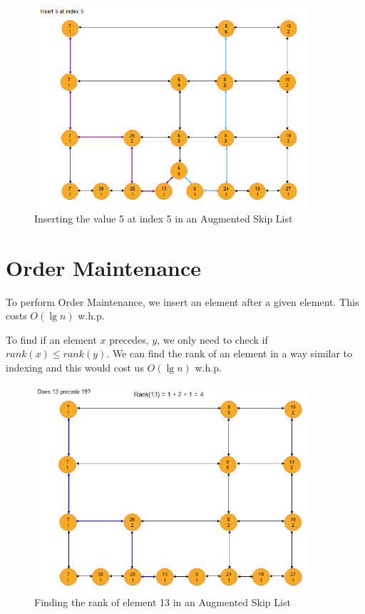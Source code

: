 \documentclass{article}
\begin{document}
\begin{figure}[h!]
  \begin{center}
    \includegraphics[width=4in]{images/Insert.jpg}
    \caption{Inserting the value 5 at index 5 in an Augmented Skip List}
    \label{fig:Insert}
  \end{center}
\end {figure}



\clearpage

\section{Order Maintenance}

To perform Order Maintenance, we insert an element after a given
element. This costs $O(\lg{n})$ w.h.p.

To find if an element $x$ precedes, $y$, we only need to check if
$rank(x) \leq rank(y)$.  We can find the rank of an element in a way
similar to indexing and this would cost us $O(\lg{n})$ w.h.p.


\begin{figure}[h!]
  \begin{center}
    \includegraphics[width=4in]{images/OrderMaintenance1.jpg}
    \caption{Finding the rank of element 13 in an Augmented Skip List}
    \label{fig:OrderMaintenance1}
  \end{center}
\end {figure}
\end{document}

